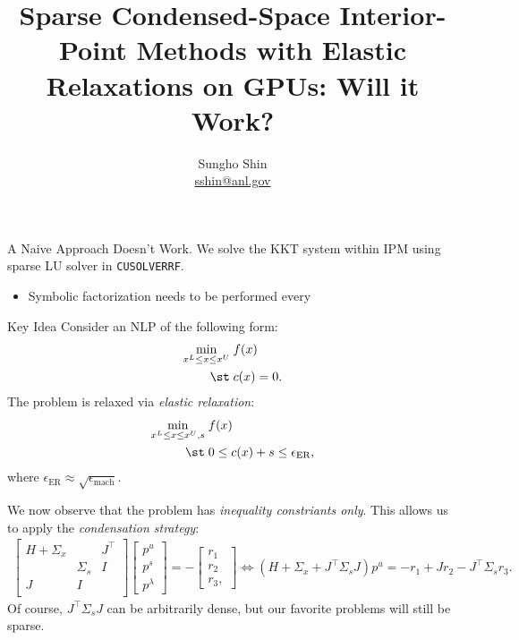 % 

\title{{\bfseries Sparse Condensed-Space Interior-Point Methods with Elastic Relaxations on GPUs: Will it Work?}}

\graphicspath{}

\author[Sungho Shin]{
  Sungho Shin\\
  {\normalfont\footnotesize\url{sshin@anl.gov}}
}
\subtitle{}



{
}

\begin{frame}{A Naive Approach Doesn't Work.}
  We solve the KKT system within IPM using sparse LU solver in \texttt{CUSOLVERRF}.

  \begin{itemize}
  \item Symbolic factorization needs to be performed every 
  \end{itemize}  
\end{frame}

\begin{frame}{Key Idea}
  Consider an NLP of the following form: 
  \begin{align*}
    \mathop{\text{min}}_{x^L\leq x\leq x^U}\;& f(x)\;\\
    \st\;&c(x) = 0.
  \end{align*}
  The problem is relaxed via {\it elastic relaxation}:
  \begin{align*}
    \mathop{\text{min}}_{x^L\leq x\leq x^U, s}\;& f(x)\;\\
    \st\;& 0\leq c(x) + s\leq \epsilon_{\text{ER}},
  \end{align*}
  where $\epsilon_{\text{ER}}\approx \sqrt{\epsilon_{\text{mach}}}$.

  We now observe that the problem has {\it inequality constriants only}. This allows us to apply the {\it condensation strategy}:
  \begin{align*}
    \begin{bmatrix}
      H + \Sigma_x & &J^\top \\
      & \Sigma_s &I \\
      J & I &\\
    \end{bmatrix}
    \begin{bmatrix}
      p^u \\ p^s \\ p^\lambda
    \end{bmatrix}  = -
    \begin{bmatrix}
      r_1 \\ r_2 \\ r_3 ,
    \end{bmatrix}
    \iff \left(H + \Sigma_x+ J^\top \Sigma_s J \right) p^u = -r_1 + J r_2 - J^\top \Sigma_s r_3.
  \end{align*}
  Of course, $J^\top \Sigma_s J$ can be arbitrarily dense, but our favorite problems will still be sparse.
\end{frame}

